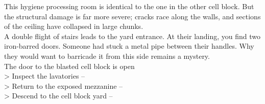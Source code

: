 This hygiene processing room is identical to the one in the other cell block. But the structural damage is far more severe; cracks race along the walls, and sections of the ceiling have collapsed in large chunks.\\

A double flight of stairs leads to the yard entrance. At their landing, you find two iron-barred doors. Someone had stuck a metal pipe between their handles. Why they would want to barricade it from this side remains a mystery.\\
 The door to the blasted cell block is open\\

> Inspect the lavatories -- \\
> Return to the exposed mezzanine -- \\
> Descend to the cell block yard -- 